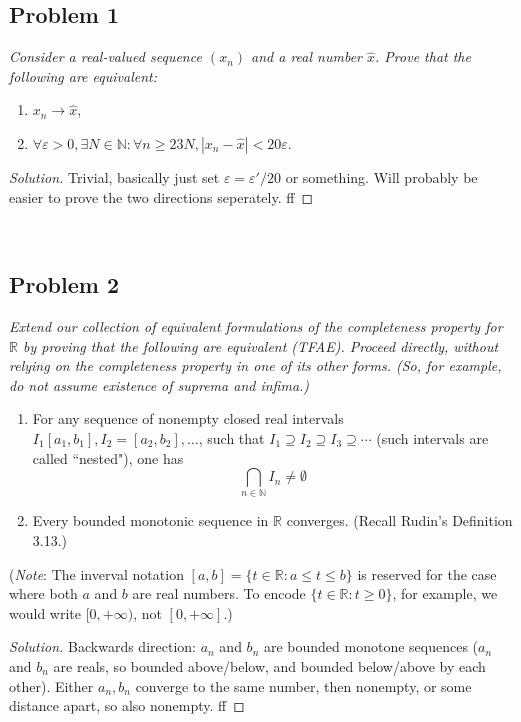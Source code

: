 \documentclass{article}
\newcommand{\N}{{\mathbb N}}
\newcommand{\R}{{\mathbb R}}
\newcommand{\ep}{{\varepsilon}}
\begin{document}
\subsection*{Problem 1}
{\it Consider a real-valued sequence $(x_n)$ and a real number $\hat{x}$.
	Prove that the following are equivalent:
\begin{enumerate}
	\item $x_n \to \hat{x}$,
	\item $\forall \ep > 0, \exists N \in \N \colon
		\forall n \geq 23N, |x_n - \hat{x}| < 20\ep$.
\end{enumerate}}

\begin{proof}[Solution]\let\qed\relax
	Trivial, basically just set $\ep = \ep'/20$ or something.
	Will probably be easier to prove the two directions seperately.
	ff
\end{proof}
\clearpage
~\clearpage

\subsection*{Problem 2}
{\it Extend our collection of equivalent formulations of
the completeness property for $\R$ by proving
that the following are equivalent (TFAE).
Proceed directly, without relying on the completeness property in one of its other forms.
(So, for example, do not assume existence of suprema and infima.)
\begin{enumerate}
	\item For any sequence of nonempty closed real intervals
		$I_1 [a_1,b_1], I_2=[a_2,b_2], \dots$,
		such that $I_1 \supseteq I_2 \supseteq I_3 \supseteq \cdots$
		(such intervals are called ``nested"), one has
		\[
			\bigcap_{n\in\N} I_n \neq \emptyset
		\]
	\item Every bounded monotonic sequence in $\R$ converges.
		(Recall Rudin's Definition 3.13.)
\end{enumerate}
(\emph{Note}: The inverval notation $[a,b] = \{t \in \R\colon a \leq t \leq b\}$
is reserved for the case where both $a$ and $b$ are real numbers.
To encode $\{t \in \R \colon t \geq 0\}$, for example,
we would write $[0,+\infty)$, not $[0,+\infty]$.)}

\begin{proof}[Solution]\let\qed\relax
	Backwards direction:
	$a_n$ and $b_n$ are bounded monotone sequences
	($a_n$ and $b_n$ are reals,
	so bounded above/below,
	and bounded below/above by each other).
	Either $a_n,b_n$ converge to the same number,
	then nonempty,
	or some distance apart, so also nonempty.
	ff
\end{proof}
\clearpage
~\clearpage
\end{document}
